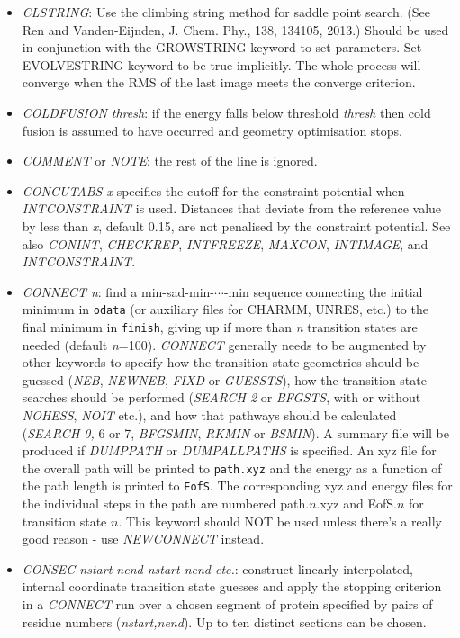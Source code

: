 \documentclass[12pt,a4paper,dvips]{article}
\begin{document}
\begin{itemize}
\item {\it  CLSTRING\/}: Use the climbing string method for saddle point search. (See Ren and Vanden-Eijnden, J. Chem. Phy., 138, 134105, 2013.) Should be used in conjunction with the GROWSTRING keyword to set parameters. Set EVOLVESTRING keyword to be true implicitly. The whole process will converge when the RMS of the last image meets the converge criterion.

\item {\it COLDFUSION thresh\/}: if the energy falls below threshold {\it thresh} then
cold fusion is assumed to have occurred and geometry optimisation stops.

\item {\it COMMENT\/} or {\it NOTE\/}: the rest of the line is ignored.

\item{\it CONCUTABS x\/} specifies the cutoff for the constraint potential
when {\it INTCONSTRAINT\/} is used. Distances that deviate from the reference
value by less than {\it x\/}, default 0.15, are not penalised by the constraint potential.
See also
{\it CONINT\/},
{\it CHECKREP\/},
{\it INTFREEZE\/},
{\it MAXCON\/},
{\it INTIMAGE\/}, and
{\it INTCONSTRAINT\/}.

\item {\it CONNECT n\/}: find a min-sad-min-$\cdots$-min sequence connecting
the initial minimum in {\tt odata}  
(or auxiliary files for CHARMM, UNRES, etc.) to the final minimum in {\tt finish},
giving up if more than {\it n\/} transition states are needed (default {\it n\/}=100). {\it CONNECT\/}
generally needs to be augmented by other keywords to specify how the transition
state geometries should be guessed ({\it NEB\/}, {\it NEWNEB\/}, {\it FIXD\/}
or {\it GUESSTS\/}), how the transition
state searches should be performed ({\it SEARCH 2\/} or {\it BFGSTS\/}, with or
without {\it NOHESS\/}, {\it NOIT\/} etc.), and how that pathways should be
calculated ({\it SEARCH 0,\/} 6 or 7, {\it BFGSMIN\/}, {\it RKMIN} or {\it BSMIN\/}).
A summary file will be produced if {\it DUMPPATH\/} or {\it DUMPALLPATHS\/} is specified. An xyz file
for the overall path will be printed to {\tt path.xyz} and the energy as a
function of the path length is printed to {\tt EofS}. The corresponding xyz and energy
files for the individual steps in the path are numbered path.$n$.xyz and EofS.$n$ for
transition state $n$. This keyword should NOT be used unless there's a really good reason - 
use {\it NEWCONNECT\/} instead.

\item {\it CONSEC nstart nend nstart nend etc.\/}: construct linearly interpolated, internal coordinate
transition state guesses and apply the stopping criterion in a {\it CONNECT\/} run over a chosen
segment of protein specified by pairs of residue numbers
({\it nstart,nend\/}).  Up to ten distinct sections can be chosen.


\end{itemize}
\end{document}
